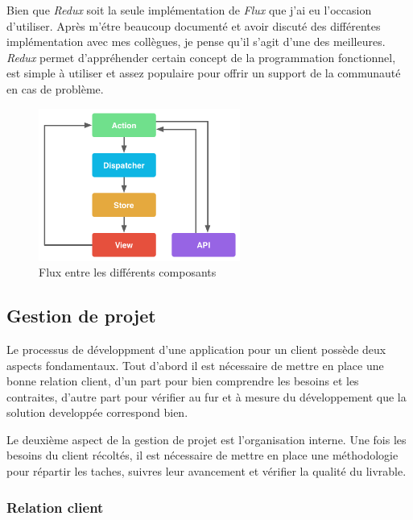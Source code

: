 \bigskip

Bien que \emph{Redux} soit la seule implémentation de \emph{Flux} que
j'ai eu l'occasion d'utiliser. Après m'étre beaucoup documenté et avoir
discuté des différentes implémentation avec mes collègues, je pense
qu'il s'agit d'une des meilleures. \emph{Redux} permet d'appréhender
certain concept de la programmation fonctionnel, est simple à utiliser
et assez populaire pour offrir un support de la communauté en cas de
problème.

\bigskip

\begin{figure}[h]
  \centering
  \includegraphics[height=5cm]{figures/react.png}
  \caption{Flux entre les différents composants}
\end{figure}

\subsection{Gestion de projet}\label{gestion-de-projet}

Le processus de développment d'une application pour un client possède
deux aspects fondamentaux. Tout d'abord il est nécessaire de mettre en
place une bonne relation client, d'un part pour bien comprendre les
besoins et les contraites, d'autre part pour vérifier au fur et à mesure
du développement que la solution developpée correspond bien.

Le deuxième aspect de la gestion de projet est l'organisation interne.
Une fois les besoins du client récoltés, il est nécessaire de mettre en
place une méthodologie pour répartir les taches, suivres leur avancement
et vérifier la qualité du livrable.

\bigskip

\subsubsection{Relation client}\label{relation-client}

\bigskip

